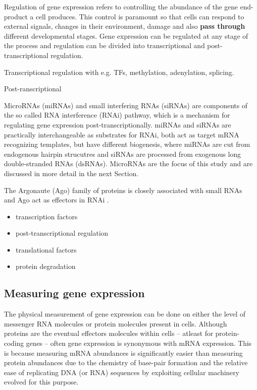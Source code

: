 Regulation of gene expression refers to controlling the abundance of
the gene end-product a cell produces. This control is paramount so that cells
can respond to external signals, changes in their environment, damage and also 
\textbf{pass through} different developmental stages. Gene expression can be regulated
at any stage of the process and regulation can be divided into transcriptional
and post-transcriptional regulation.

Transcriptional regulation with e.g. TFs, methylation, adenylation, splicing.

Post-ranscriptional

MicroRNAs (miRNAs) and small interfering RNAs (siRNAs) are components of the
so called RNA interference (RNAi) pathway, which is a mechanism for regulating
gene expression post-transcriptionally. miRNAs and siRNAs are practically
interchangeable as substrates for RNAi, both act as target mRNA recognizing
templates, but have different biogenesis, where miRNAs are cut from endogenous hairpin
strucutres and siRNAs are processed from exogenous long double-stranded RNAs (dsRNAs).
\cite{Du2005} MicroRNAs are the focus of this study and are discussed in more
detail in the next Section.

The Argonaute (Ago) family of proteins is closely associated with small RNAs and
Ago act as effectors in RNAi \cite{Ha2014}.

\begin{itemize}
  \item transcription factors
  \item post-transcriptional regulation
  \item translational factors
  \item protein degradation
\end{itemize}


\subsection{Measuring gene expression}\label{measurement-of-gene-expression}

The physical measurement of gene expression can be done on either the level of
messenger RNA molecules or protein molecules present in cells. Although
proteins are the eventual effectors molecules within cells -- atleast for
protein-coding genes -- often gene expression is synonymous with mRNA
expression. This is because measuring mRNA abundances is significantly easier than
measuring protein abundances due to the chemistry of base-pair formation
and the relative ease of replicating DNA (or RNA) sequences by
exploiting cellular machinery evolved for this purpose.

